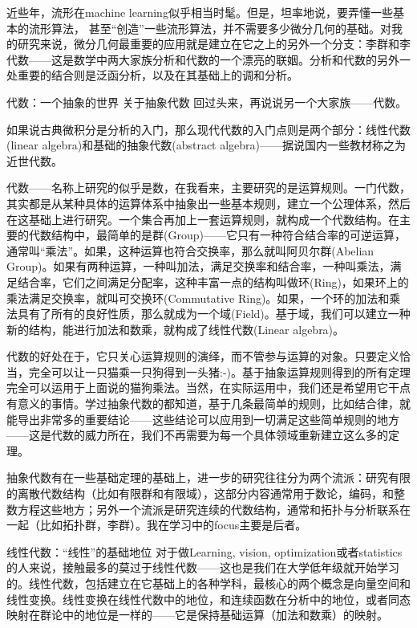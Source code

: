近些年，流形在machine learning似乎相当时髦。但是，坦率地说，要弄懂一些基本的流形算法， 甚至“创造”一些流形算法，并不需要多少微分几何的基础。对我的研究来说，微分几何最重要的应用就是建立在它之上的另外一个分支：李群和李代数——这是数学中两大家族分析和代数的一个漂亮的联姻。分析和代数的另外一处重要的结合则是泛函分析，以及在其基础上的调和分析。

 

代数：一个抽象的世界
关于抽象代数
回过头来，再说说另一个大家族——代数。

如果说古典微积分是分析的入门，那么现代代数的入门点则是两个部分：线性代数(linear algebra)和基础的抽象代数(abstract algebra)——据说国内一些教材称之为近世代数。

代数——名称上研究的似乎是数，在我看来，主要研究的是运算规则。一门代数，其实都是从某种具体的运算体系中抽象出一些基本规则，建立一个公理体系，然后在这基础上进行研究。一个集合再加上一套运算规则，就构成一个代数结构。在主要的代数结构中，最简单的是群(Group)——它只有一种符合结合率的可逆运算，通常叫“乘法”。如果，这种运算也符合交换率，那么就叫阿贝尔群(Abelian Group)。如果有两种运算，一种叫加法，满足交换率和结合率，一种叫乘法，满足结合率，它们之间满足分配率，这种丰富一点的结构叫做环(Ring)，如果环上的乘法满足交换率，就叫可交换环(Commutative Ring)。如果，一个环的加法和乘法具有了所有的良好性质，那么就成为一个域(Field)。基于域，我们可以建立一种新的结构，能进行加法和数乘，就构成了线性代数(Linear algebra)。

代数的好处在于，它只关心运算规则的演绎，而不管参与运算的对象。只要定义恰当，完全可以让一只猫乘一只狗得到一头猪:-)。基于抽象运算规则得到的所有定理完全可以运用于上面说的猫狗乘法。当然，在实际运用中，我们还是希望用它干点有意义的事情。学过抽象代数的都知道，基于几条最简单的规则，比如结合律，就能导出非常多的重要结论——这些结论可以应用到一切满足这些简单规则的地方——这是代数的威力所在，我们不再需要为每一个具体领域重新建立这么多的定理。

抽象代数有在一些基础定理的基础上，进一步的研究往往分为两个流派：研究有限的离散代数结构（比如有限群和有限域），这部分内容通常用于数论，编码，和整数方程这些地方；另外一个流派是研究连续的代数结构，通常和拓扑与分析联系在一起（比如拓扑群，李群）。我在学习中的focus主要是后者。

线性代数：“线性”的基础地位
对于做Learning, vision, optimization或者statistics的人来说，接触最多的莫过于线性代数——这也是我们在大学低年级就开始学习的。线性代数，包括建立在它基础上的各种学科，最核心的两个概念是向量空间和线性变换。线性变换在线性代数中的地位，和连续函数在分析中的地位，或者同态映射在群论中的地位是一样的——它是保持基础运算（加法和数乘）的映射。

